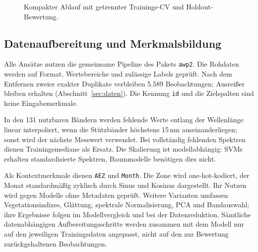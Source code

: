 \documentclass[11pt,a4paper,titlepage]{article}
\begin{document}
\begin{figure}[H]
\centering
{}
\caption{Kompakter Ablauf mit getrennter Trainings-CV und Holdout-Bewertung.}
\label{fig:methodik-pipeline}
\end{figure}

\subsection{Datenaufbereitung und Merkmalsbildung}
\label{sec:aufbereitung}

Alle Ans\"atze nutzen die gemeinsame Pipeline des Pakets \texttt{awp2}.
Die Rohdaten werden auf Format, Wertebereiche und zul\"assige Labels gepr\"uft.
Nach dem Entfernen zweier exakter Duplikate verbleiben 5.589 Beobachtungen;
Ausrei\ss{}er bleiben erhalten (Abschnitt~\ref{sec:daten}). Die Kennung
\texttt{id} und die Zielspalten sind keine Eingabemerkmale.

In den 131 nutzbaren B\"andern werden fehlende Werte entlang der Wellenl\"ange linear
interpoliert, wenn die St\"utzb\"ander h\"ochstens 15\,nm auseinanderliegen;
sonst wird der n\"achste Messwert verwendet. Bei vollst\"andig fehlenden
Spektren dienen Trainingsmediane als Ersatz. Die Skalierung ist
modellabh\"angig: SVMs erhalten standardisierte Spektren, Baummodelle
ben\"otigen dies nicht.

Als Kontextmerkmale dienen \texttt{AEZ} und \texttt{Month}. Die Zone wird
one-hot-kodiert, der Monat standardm\"a\ss{}ig zyklisch durch Sinus und Kosinus
dargestellt. Ihr Nutzen wird gegen Modelle ohne Metadaten gepr\"uft.
Weitere Varianten umfassen Vegetationsindizes, Gl\"attung, spektrale Normalisierung, PCA und
Bandauswahl; ihre Ergebnisse folgen im Modellvergleich und bei der
Datenreduktion. S\"amtliche datenabh\"angigen Aufbereitungsschritte werden
zusammen mit dem Modell nur auf den jeweiligen Trainingsdaten angepasst,
nicht auf den zur Bewertung zur\"uckgehaltenen Beobachtungen.
\end{document}
